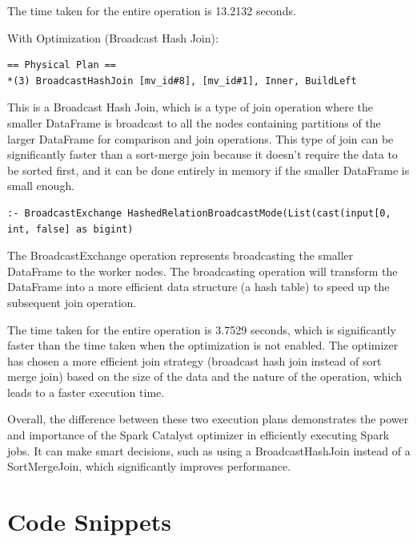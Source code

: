 \documentclass[12pt,twoside]{article}
\begin{document}
The time taken for the entire operation is 13.2132 seconds.

With Optimization (Broadcast Hash Join):

\begin{verbatim}
== Physical Plan ==
*(3) BroadcastHashJoin [mv_id#8], [mv_id#1], Inner, BuildLeft
\end{verbatim}

\noindent This is a Broadcast Hash Join, which is a type of join operation where the smaller DataFrame is broadcast to all the nodes containing partitions of the larger DataFrame for comparison and join operations. This type of join can be significantly faster than a sort-merge join because it doesn't require the data to be sorted first, and it can be done entirely in memory if the smaller DataFrame is small enough.

\begin{verbatim}
:- BroadcastExchange HashedRelationBroadcastMode(List(cast(input[0, int, false] as bigint)
\end{verbatim}

\noindent The BroadcastExchange operation represents broadcasting the smaller DataFrame to the worker nodes. The broadcasting operation will transform the DataFrame into a more efficient data structure (a hash table) to speed up the subsequent join operation.

The time taken for the entire operation is 3.7529 seconds, which is significantly faster than the time taken when the optimization is not enabled. The optimizer has chosen a more efficient join strategy (broadcast hash join instead of sort merge join) based on the size of the data and the nature of the operation, which leads to a faster execution time.

Overall, the difference between these two execution plans demonstrates the power and importance of the Spark Catalyst optimizer in efficiently executing Spark jobs. It can make smart decisions, such as using a BroadcastHashJoin instead of a SortMergeJoin, which significantly improves performance.

\section{Code Snippets}
\begin{code}
\label{code:files}
\inputminted[breaklines, breakafter=d, linenos, frame=single]{python}{./code/csv_to_parquet.py}
\end{code}
\end{document}
